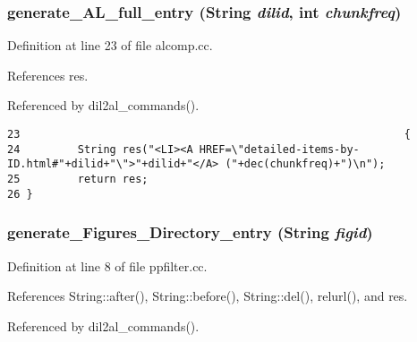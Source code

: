 \subsubsection{ generate\_\-AL\_\-full\_\-entry ({\bf String} {\em dilid}, int {\em chunkfreq})}\label{dil2al_8hh_a283}




Definition at line 23 of file alcomp.cc.

References res.

Referenced by dil2al\_\-commands().



\footnotesize\begin{verbatim}23                                                            {
24         String res("<LI><A HREF=\"detailed-items-by-ID.html#"+dilid+"\">"+dilid+"</A> ("+dec(chunkfreq)+")\n");
25         return res;
26 }
\end{verbatim}\normalsize 
{}
\subsubsection{ generate\_\-Figures\_\-Directory\_\-entry ({\bf String} {\em figid})}\label{dil2al_8hh_a347}




Definition at line 8 of file ppfilter.cc.

References String::after(), String::before(), String::del(), relurl(), and res.

Referenced by dil2al\_\-commands().



